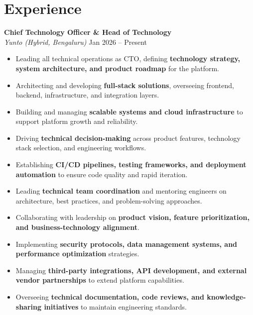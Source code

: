 \documentclass[a4paper,10pt]{article}
\begin{document}
\section*{\color{accent} Experience}

\textbf{Chief Technology Officer \& Head of Technology}\\
\emph{Yunto (Hybrid, Bengaluru)} \hfill Jan 2026 -- Present
\begin{itemize}[leftmargin=*]
    \item Leading all technical operations as CTO, defining \textbf{technology strategy, system architecture, and product roadmap} for the platform.
    \item Architecting and developing \textbf{full-stack solutions}, overseeing frontend, backend, infrastructure, and integration layers.
    \item Building and managing \textbf{scalable systems and cloud infrastructure} to support platform growth and reliability.
    \item Driving \textbf{technical decision-making} across product features, technology stack selection, and engineering workflows.
    \item Establishing \textbf{CI/CD pipelines, testing frameworks, and deployment automation} to ensure code quality and rapid iteration.
    \item Leading \textbf{technical team coordination} and mentoring engineers on architecture, best practices, and problem-solving approaches.
    \item Collaborating with leadership on \textbf{product vision, feature prioritization, and business-technology alignment}.
    \item Implementing \textbf{security protocols, data management systems, and performance optimization} strategies.
    \item Managing \textbf{third-party integrations, API development, and external vendor partnerships} to extend platform capabilities.
    \item Overseeing \textbf{technical documentation, code reviews, and knowledge-sharing initiatives} to maintain engineering standards.
\end{itemize}
\end{document}
